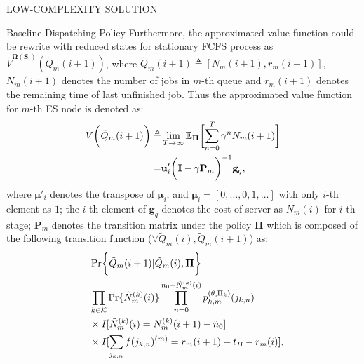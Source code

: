 \documentclass[10pt, conference, letterpaper]{IEEEtran}
\newcommand{\mat}{\mathbf}
\newcommand{\define}{\triangleq}
\renewcommand{\vec}{\mathbf}
\DeclarePairedDelimiter{\Paren}{\bigg(}{\bigg)}
\DeclarePairedDelimiter{\Bracket}{\bigg[}{\bigg]}
\DeclarePairedDelimiter{\Brace}{\bigg\{}{\bigg\}}
\newcommand{\apSet}{\mathcal{K}}
\newcommand{\Stat}{\mathbf{S}}
\newcommand{\Policy}{\mathbf{\Omega}}
\begin{document}
\begin{section}{LOW-COMPLEXITY SOLUTION}
\begin{subsection}{Baseline Dispatching Policy}
            Furthermore, the approximated value function could be rewrite with reduced states for stationary FCFS process as $\tilde{V}^{\Policy(\Stat_i)}(\tilde{Q}_m(i+1))$, where $\tilde{Q}_m(i+1) \define [N_m(i+1), r_m(i+1)]$, $N_m(i+1)$ denotes the number of jobs in $m$-th queue and $r_m(i+1)$ denotes the remaining time of last unfinished job. Thus the approximated value function for $m$-th ES node is denoted as:
            \begin{align}
                \tilde{V}\bigg(\tilde{Q}_m(i+1)\bigg) \define& \lim_{T\to\infty}
                    \mathbb{E}_{\vec{\Pi}} \Bracket{\sum_{n=0}^{T} \gamma^{n} N_m(i+1)}
                \nonumber\\
                =& \vec{u}'_i \Paren{\mat{I} - \gamma \mat{P}_m}^{-1} \vec{g}_q,
            \end{align}
            where $\vec{\mu}'_i$ denotes the transpose of $\vec{\mu}_i$, and $\vec{\mu}_i = [0,\dots,0,1,\dots]$ with only $i$-th element as $1$; the $i$-th element of $\vec{g}_q$ denotes the cost of server as $N_m(i)$ for $i$-th stage; $\mat{P}_m$ denotes the transition matrix under the policy $\vec{\Pi}$ which is composed of the following transition function ($\forall \tilde{Q}_m(i),\tilde{Q}_m(i+1)$) as:
            \begin{align}
                & \Pr \Brace{\tilde{Q}_m(i+1)|\tilde{Q}_m(i),\vec{\Pi}}
                \nonumber\\
                =& \prod_{k\in\apSet} \Pr\{\tilde{N}^{(k)}_m(i)\} \prod_{n=0}^{\tilde{n}_0 + \tilde{N}^{(k)}_m(i)} p^{(\theta,\Pi_k)}_{k,m}(j_{k,n})
                    \nonumber\\
                    &\times I[\tilde{N}^{(k)}_m(i) = N^{(k)}_m(i+1)- \tilde{n}_0]
                    \nonumber\\
                    &\times I[\sum_{j_{k,n}} f(j_{k,n})^{(m)} = r_m(i+1)+t_B-r_m(i)],

\end{align}
\end{subsection}
\end{section}
\end{document}
